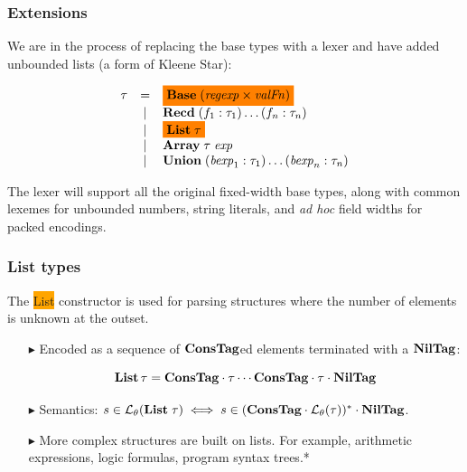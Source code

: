 \documentclass{beamer}
\newcommand{\adhoc}{\textit{ad hoc}}
\newcommand{\kemph}[1]{\colorbox{orange}{#1}}
\newcommand{\highlight}[2][orange]{\mathchoice%
  {\colorbox{#1}{$\displaystyle#2$}}%
  {\colorbox{#1}{$\textstyle#2$}}%
  {\colorbox{#1}{$\scriptstyle#2$}}%
  {\colorbox{#1}{$\scriptscriptstyle#2$}}}%
\newcommand{\konst}[1]{\ensuremath{\mbox{\bf{#1}}}}
\newcommand{\LangTheta}[1]{\ensuremath{{\mathcal L}_{\theta}({#1})}}
\begin{document}
\begin{frame}\frametitle{Extensions}

We are in the process of replacing the base types with a lexer and
have added unbounded lists (a form of Kleene Star):

\[
\begin{array}{rcl}
 \tau & =    & \highlight{\konst{Base}\; (\mathit{regexp} \times \mathit{valFn})} \\
      & \mid & \konst{Recd}\; (f_1 : \tau_1) \ldots (f_n : \tau_n) \\
      & \mid & \highlight{\konst{List}\; \tau} \\
      & \mid & \konst{Array}\; \tau \; \mathit{exp} \\
      & \mid & \konst{Union}\; (\mathit{bexp}_1 : \tau_1) \ldots (\mathit{bexp}_n : \tau_n)
\end{array}
\]

The lexer will support all the original fixed-width base types, along
with common lexemes for unbounded numbers, string literals, and
\adhoc{} field widths for packed encodings.

\end{frame}


\begin{frame}[fragile]\frametitle{List types}

The \kemph{List} constructor is used for parsing structures where the
number of elements is unknown at the outset.

\begin{itemize}

\item [$\blacktriangleright$] Encoded as a sequence of \konst{ConsTag}ed elements
  terminated with a \konst{NilTag}:

\[
  \konst{List}\, \tau = \konst{ConsTag} \cdot \tau \cdots \konst{ConsTag} \cdot \tau \cdot \konst{NilTag}
\]

\item [$\blacktriangleright$] Semantics: $s \in \LangTheta{\konst{List}\;\tau} \iff
  s \in (\konst{ConsTag} \cdot \LangTheta{\tau})^{*} \cdot \konst{NilTag}$.

\item [$\blacktriangleright$] More complex structures are built on
  lists. For example, arithmetic expressions, logic formulas, program
  syntax trees.*


\end{itemize}
\end{frame}
\end{document}
